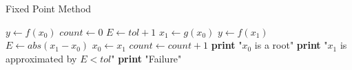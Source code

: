 \documentclass{article}
\begin{document}
  \begin{algorithm}
    \caption{Fixed Point Method}
    \begin{algorithmic}[1]
        \State $y \gets f(x_{0})$
        \State $count \gets 0$
        \State $E \gets tol + 1$
          \State $x_{1} \gets g(x_{0})$
          \State $y \gets f(x_{1})$
          \State $E \gets abs(x_{1} - x_{0})$
          \State $x_{0} \gets x_{1}$
          \State $count \gets count + 1$
        \EndWhile
          \State \textbf{print} "$x_{0}$ is a root"
          \State \textbf{print} "$x_{1}$ is approximated by $E < tol$"
        \Else
          \State \textbf{print} "Failure"
        \EndIf
      \EndProcedure
    \end{algorithmic}
  \end{algorithm}
\end{document}
